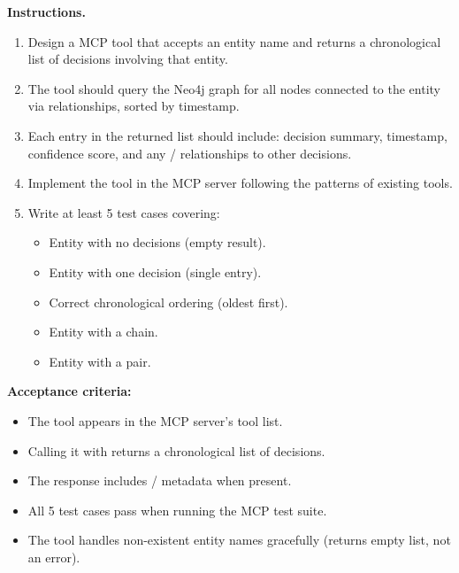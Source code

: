 \medskip\noindent\textbf{Instructions.}

\begin{enumerate}
    \item Design a  MCP tool that accepts an
          entity name and returns a chronological list of decisions
          involving that entity.
    \item The tool should query the Neo4j graph for all
           nodes connected to the entity via
           relationships, sorted by timestamp.
    \item Each entry in the returned list should include: decision
          summary, timestamp, confidence score, and any
          / relationships to other
          decisions.
    \item Implement the tool in the MCP server following the patterns of
          existing tools.
    \item Write at least 5 test cases covering:
          \begin{itemize}
              \item Entity with no decisions (empty result).
              \item Entity with one decision (single entry).
              \item Correct chronological ordering (oldest first).
              \item Entity with a  chain.
              \item Entity with a  pair.
          \end{itemize}
\end{enumerate}

\begin{tryit}
\textbf{Acceptance criteria:}
\begin{itemize}
    \item The  tool appears in the MCP server's
          tool list.
    \item Calling it with  returns a chronological list
          of decisions.
    \item The response includes / metadata
          when present.
    \item All 5 test cases pass when running the MCP test suite.
    \item The tool handles non-existent entity names gracefully (returns
          empty list, not an error).
\end{itemize}
\end{tryit}

